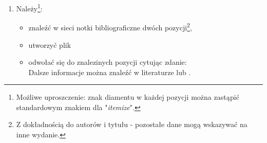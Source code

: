 \documentclass[a4paper,11pt]{article}
\begin{document}
\begin{enumerate}
            \item Należy\footnote{
            Możliwe uproszczenie: znak diamentu w każdej pozycji można zastąpić standardowym znakiem dla "\textit{itemize}".
            }:
              \renewcommand{\labelitemi}{$\diamondsuit$}
              \begin{itemize}
              	\item znaleźć w sieci notki bibliograficzne dwóch pozycji\footnote{
              	Z dokładnością do autorów i tytułu - pozostałe dane mogą wskazywać na inne wydanie.
              	},
              	\item utworzyć plik 
              	\normalfont %
              	\item odwołać się do znalezinych pozycji cytując zdanie: \\
              	\indent Dalsze informacje można znaleźć w literaturze \cite{bulirsch:02} lub \cite{Kernighan:1988:CPL:576122}.
              \end{itemize}
        \end{enumerate}
        
        \renewcommand\refname{Literatura}
        
        

      
\end{document}
